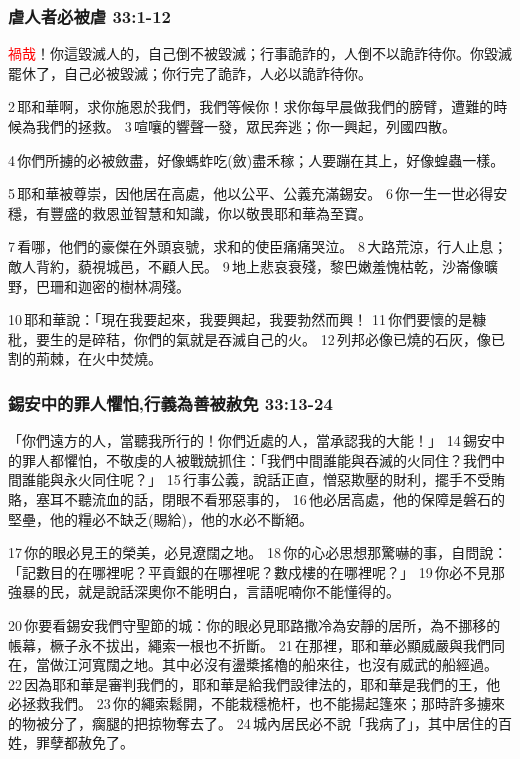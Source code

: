 \subsubsection{虐人者必被虐 33:1-12}
\textcolor{red}{禍哉}！你這毀滅人的，自己倒不被毀滅；行事詭詐的，人倒不以詭詐待你。你毀滅罷休了，自己必被毀滅；你行完了詭詐，人必以詭詐待你。 

2 耶和華啊，求你施恩於我們，我們等候你！求你每早晨做我們的膀臂，遭難的時候為我們的拯救。 3 喧嚷的響聲一發，眾民奔逃；你一興起，列國四散。 

4 你們所擄的必被斂盡，好像螞蚱吃(斂)盡禾稼；人要蹦在其上，好像蝗蟲一樣。 

5 耶和華被尊崇，因他居在高處，他以公平、公義充滿錫安。 6 你一生一世必得安穩，有豐盛的救恩並智慧和知識，你以敬畏耶和華為至寶。

7 看哪，他們的豪傑在外頭哀號，求和的使臣痛痛哭泣。 8 大路荒涼，行人止息；敵人背約，藐視城邑，不顧人民。 9 地上悲哀衰殘，黎巴嫩羞愧枯乾，沙崙像曠野，巴珊和迦密的樹林凋殘。 

10 耶和華說：「現在我要起來，我要興起，我要勃然而興！ 11 你們要懷的是糠秕，要生的是碎秸，你們的氣就是吞滅自己的火。 12 列邦必像已燒的石灰，像已割的荊棘，在火中焚燒。

\subsubsection{錫安中的罪人懼怕,行義為善被赦免 33:13-24}
「你們遠方的人，當聽我所行的！你們近處的人，當承認我的大能！」 14 錫安中的罪人都懼怕，不敬虔的人被戰兢抓住：「我們中間誰能與吞滅的火同住？我們中間誰能與永火同住呢？」 15 行事公義，說話正直，憎惡欺壓的財利，擺手不受賄賂，塞耳不聽流血的話，閉眼不看邪惡事的， 16 他必居高處，他的保障是磐石的堅壘，他的糧必不缺乏(賜給)，他的水必不斷絕。

17 你的眼必見王的榮美，必見遼闊之地。 18 你的心必思想那驚嚇的事，自問說：「記數目的在哪裡呢？平貢銀的在哪裡呢？數戍樓的在哪裡呢？」 19 你必不見那強暴的民，就是說話深奧你不能明白，言語呢喃你不能懂得的。 

20 你要看錫安我們守聖節的城：你的眼必見耶路撒冷為安靜的居所，為不挪移的帳幕，橛子永不拔出，繩索一根也不折斷。 21 在那裡，耶和華必顯威嚴與我們同在，當做江河寬闊之地。其中必沒有盪槳搖櫓的船來往，也沒有威武的船經過。 22 因為耶和華是審判我們的，耶和華是給我們設律法的，耶和華是我們的王，他必拯救我們。 23 你的繩索鬆開，不能栽穩桅杆，也不能揚起篷來；那時許多擄來的物被分了，瘸腿的把掠物奪去了。 24 城內居民必不說「我病了」，其中居住的百姓，罪孽都赦免了。

